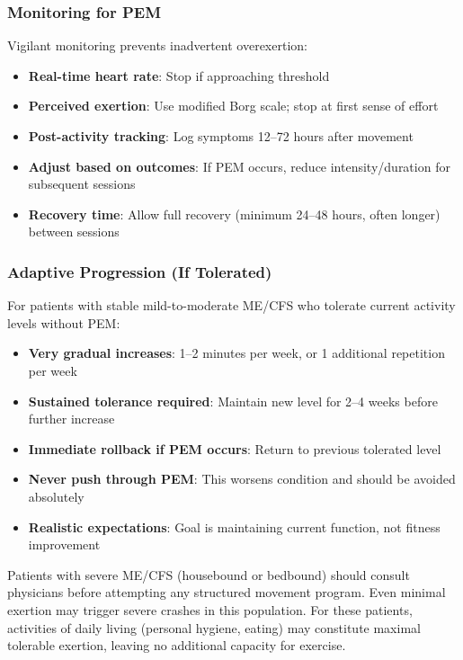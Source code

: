 \subsubsection{Monitoring for PEM}

Vigilant monitoring prevents inadvertent overexertion:

\begin{itemize}
    \item \textbf{Real-time heart rate}: Stop if approaching threshold
    \item \textbf{Perceived exertion}: Use modified Borg scale; stop at first sense of effort
    \item \textbf{Post-activity tracking}: Log symptoms 12--72 hours after movement
    \item \textbf{Adjust based on outcomes}: If PEM occurs, reduce intensity/duration for subsequent sessions
    \item \textbf{Recovery time}: Allow full recovery (minimum 24--48 hours, often longer) between sessions
\end{itemize}

\subsubsection{Adaptive Progression (If Tolerated)}

For patients with stable mild-to-moderate ME/CFS who tolerate current activity levels without PEM:

\begin{itemize}
    \item \textbf{Very gradual increases}: 1--2 minutes per week, or 1 additional repetition per week
    \item \textbf{Sustained tolerance required}: Maintain new level for 2--4 weeks before further increase
    \item \textbf{Immediate rollback if PEM occurs}: Return to previous tolerated level
    \item \textbf{Never push through PEM}: This worsens condition and should be avoided absolutely
    \item \textbf{Realistic expectations}: Goal is maintaining current function, not fitness improvement
\end{itemize}

\begin{warning}
Patients with severe ME/CFS (housebound or bedbound) should consult physicians before attempting any structured movement program. Even minimal exertion may trigger severe crashes in this population. For these patients, activities of daily living (personal hygiene, eating) may constitute maximal tolerable exertion, leaving no additional capacity for exercise.
\end{warning}

